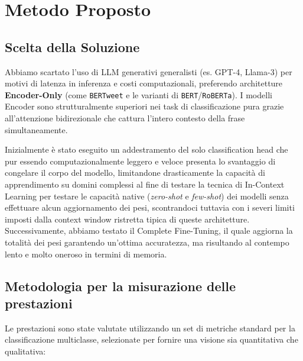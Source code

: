 \documentclass[a4paper,12pt]{article}
\begin{document}
\section{Metodo Proposto}

\subsection{Scelta della Soluzione}
Abbiamo scartato l'uso di LLM generativi generalisti (es. GPT-4, Llama-3) per motivi di latenza in inferenza e costi computazionali, preferendo architetture \textbf{Encoder-Only} (come \texttt{BERTweet} e le varianti di \texttt{BERT}/\texttt{RoBERTa}). I modelli Encoder sono strutturalmente superiori nei task di classificazione pura grazie all'attenzione bidirezionale che cattura l'intero contesto della frase simultaneamente.

Inizialmente è stato eseguito un addestramento del solo classification
head che pur essendo computazionalmente leggero e veloce presenta lo svantaggio di
congelare il corpo del modello, limitandone drasticamente la capacità di apprendimento
su domini complessi al fine di testare la tecnica di In-Context Learning per
testare le capacità native (\textit{zero-shot} e \textit{few-shot}) dei
modelli senza effettuare alcun aggiornamento dei pesi, scontrandoci tuttavia con i severi limiti imposti dalla context window
ristretta tipica di queste architetture.
Successivamente, abbiamo testato il Complete Fine-Tuning, il quale aggiorna la
totalità dei pesi garantendo un’ottima accuratezza, ma risultando al contempo lento
e molto oneroso in termini di memoria.


\subsection{Metodologia per la misurazione delle prestazioni}
Le prestazioni sono state valutate utilizzando un set di metriche standard per la classificazione multiclasse, selezionate per fornire una visione sia quantitativa che qualitativa:
\end{document}
